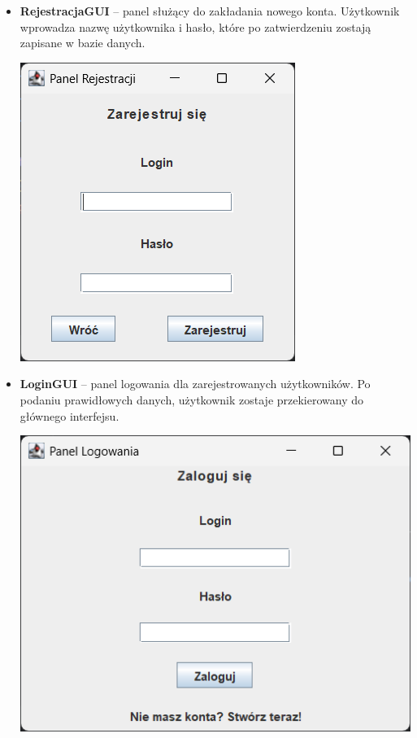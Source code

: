 \documentclass{urdpl}     %
\begin{document}
\begin{itemize}
  \item
  \begin{minipage}[t]{\linewidth}
    \textbf{RejestracjaGUI} -- panel służący do zakładania nowego konta. Użytkownik wprowadza nazwę użytkownika i hasło, które po zatwierdzeniu zostają zapisane w bazie danych.

    \vspace{0.3em}
    \begin{center}
      \includegraphics[width=0.75\linewidth]{rejestracja.png}
      \label{fig:rejestracja}
    \end{center}
  \end{minipage}

  \item
  \begin{minipage}[t]{\linewidth}
    \textbf{LoginGUI} -- panel logowania dla zarejestrowanych użytkowników. Po podaniu prawidłowych danych, użytkownik zostaje przekierowany do głównego interfejsu.

    \vspace{0.3em}
    \begin{center}
      \includegraphics[width=0.75\linewidth]{logowanie.png}
      \label{fig:logowanie}
    \end{center}
  \end{minipage}


\end{itemize}
\end{document}
